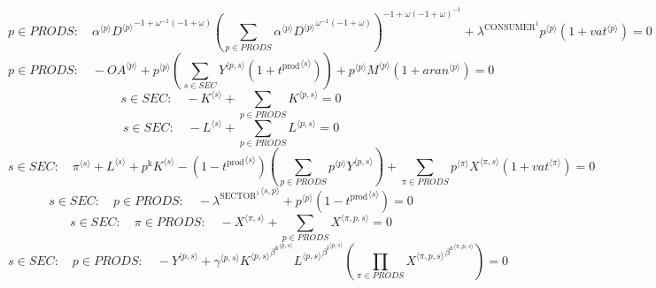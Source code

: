\begin{equation}
p\in {P\!R\!O\!D\!S}\colon\quad {{\alpha}^{\langle p\rangle}} {{{D}^{\langle p\rangle}}^{-1 + {\omega}^{-1} \left(-1 + \omega\right)}} {\left(\sum_{p\in {P\!R\!O\!D\!S}} {{\alpha}^{\langle p\rangle}} {{{D}^{\langle p\rangle}}^{{\omega}^{-1} \left(-1 + \omega\right)}}\right)^{-1 + {\omega} \left(-1 + \omega\right)^{-1}}} + {\lambda^{\mathrm{CONSUMER}^{\mathrm{1}}}} {{p}^{\langle p\rangle}} \left(1 + {{v\!a\!t}}^{\langle p\rangle}\right) = 0
\end{equation}
\begin{equation}
p\in {P\!R\!O\!D\!S}\colon\quad -{{O\!A}}^{\langle p\rangle} + {{p}^{\langle p\rangle}} \left(\sum_{s\in {S\!E\!C}} {{Y}^{\langle p,s\rangle}} \left(1 + {t^{\mathrm{prod}}}^{\langle s\rangle}\right)\right) + {{p}^{\langle p\rangle}} {{M}^{\langle p\rangle}} \left(1 + {{a\!r\!a\!n}}^{\langle p\rangle}\right) = 0
\end{equation}
\begin{equation}
s\in {S\!E\!C}\colon\quad -{K}^{\langle s\rangle} + \sum_{p\in {P\!R\!O\!D\!S}} {K}^{\langle p,s\rangle} = 0
\end{equation}
\begin{equation}
s\in {S\!E\!C}\colon\quad -{L}^{\langle s\rangle} + \sum_{p\in {P\!R\!O\!D\!S}} {L}^{\langle p,s\rangle} = 0
\end{equation}
\begin{equation}
s\in {S\!E\!C}\colon\quad {\pi}^{\langle s\rangle} + {L}^{\langle s\rangle} + {p^{\mathrm{k}}} {{K}^{\langle s\rangle}} - \left(1 - {t^{\mathrm{prod}}}^{\langle s\rangle}\right) \left(\sum_{p\in {P\!R\!O\!D\!S}} {{p}^{\langle p\rangle}} {{Y}^{\langle p,s\rangle}}\right) + \sum_{\pi\in {P\!R\!O\!D\!S}} {{p}^{\langle \pi\rangle}} {{X}^{\langle \pi,s\rangle}} \left(1 + {{v\!a\!t}}^{\langle \pi\rangle}\right) = 0
\end{equation}
\begin{equation}
s\in {S\!E\!C}\colon\quad p\in {P\!R\!O\!D\!S}\colon\quad -{\lambda^{\mathrm{SECTOR}^{\mathrm{1}}}}^{\langle s,p\rangle} + {{p}^{\langle p\rangle}} \left(1 - {t^{\mathrm{prod}}}^{\langle s\rangle}\right) = 0
\end{equation}
\begin{equation}
s\in {S\!E\!C}\colon\quad \pi\in {P\!R\!O\!D\!S}\colon\quad -{X}^{\langle \pi,s\rangle} + \sum_{p\in {P\!R\!O\!D\!S}} {X}^{\langle \pi,p,s\rangle} = 0
\end{equation}
\begin{equation}
s\in {S\!E\!C}\colon\quad p\in {P\!R\!O\!D\!S}\colon\quad -{Y}^{\langle p,s\rangle} + {{\gamma}^{\langle p,s\rangle}} {{{K}^{\langle p,s\rangle}}^{{\beta^{\mathrm{k}}}^{\langle p,s\rangle}}} {{{L}^{\langle p,s\rangle}}^{{\beta^{\mathrm{l}}}^{\langle p,s\rangle}}} \left(\prod_{\pi\in {P\!R\!O\!D\!S}} {{X}^{\langle \pi,p,s\rangle}}^{{\beta^{\mathrm{x}}}^{\langle \pi,p,s\rangle}}\right) = 0
\end{equation}
